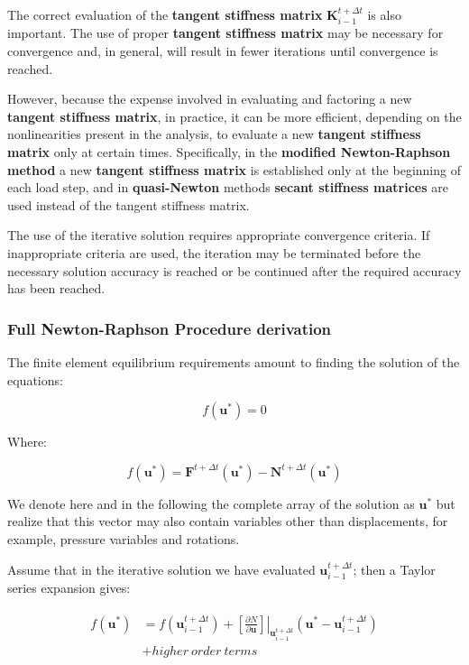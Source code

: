 \documentclass[10pt,b5paper,titlepage]{book}
\newcommand{\m}{\mathbf}
\newenvironment{eqarray}
{
    \begin{eqnarray}
        \begin{aligned}
}
{
        \end{aligned}
    \end{eqnarray}
}
\begin{document}
The correct evaluation of the \textbf{tangent stiffness matrix}
$ \m{K}_{i-1}^{t + \Delta t} $ is also important. The use of proper
\textbf{tangent stiffness matrix} may be necessary for convergence and, in general,
will result in fewer iterations until convergence is reached.

However, because the expense involved in evaluating and factoring a new
\textbf{tangent stiffness matrix}, in practice, it can be more efficient,
depending on the nonlinearities present in the analysis, to evaluate a new
\textbf{tangent stiffness matrix} only at certain times. Specifically,
in the \textbf{modified Newton-Raphson method} a new \textbf{tangent stiffness matrix}
is established only at the beginning of each load step, and in
\textbf{quasi-Newton} methods \textbf{secant stiffness matrices} are used
instead of the tangent stiffness matrix.

The use of the iterative solution requires appropriate convergence criteria.
If inappropriate criteria are used, the iteration may be terminated before
the necessary solution accuracy is reached or be continued after the required
accuracy has been reached.

\subsubsection{Full Newton-Raphson Procedure derivation}

The finite element equilibrium requirements amount to finding the solution
of the equations:

\begin{equation}\label{nr-error}
    f( \m{u}^* ) = 0
\end{equation}

Where:

\begin{equation}\label{nr-error-expanded}
    f( \m{u}^* ) = \m{F}^{t + \Delta t} ( \m{u}^* )
    - \m{N}^{t + \Delta t} ( \m{u}^* )
\end{equation}

We denote here and in the following the complete array of the solution as
$ \m{u}^* $ but realize that this vector may also contain variables other
than displacements, for example, pressure variables and rotations.

Assume that in the iterative solution we have evaluated $ \m{u}_{i-1}^{t + \Delta t} $;
then a Taylor series expansion gives:

\begin{eqarray}\label{newton-raphson-taylor-expansion}
    f(\m{u}^*) &= f(\m{u}_{i-1}^{t + \Delta t})
    + \left. \left[\frac{\partial N}{\partial \m{u}} \right]
        \right|_{\m{u}_{i-1}^{t + \Delta t}}
        \left( \m{u}^* - \m{u}_{i-1}^{t + \Delta t} \right) \\
                    &+ higher\ order\ terms
\end{eqarray}
\end{document}
